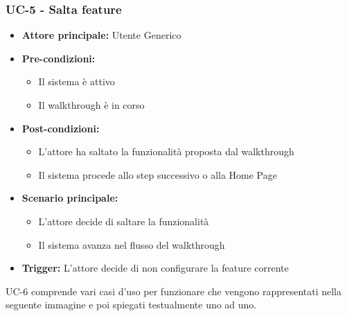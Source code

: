 \documentclass[a4paper,12pt]{article}
\begin{document}
\subsubsection{UC-5 - Salta feature} \label{subsec:UC-5}
\begin{itemize}
    \item \textbf{Attore principale:} Utente Generico
    \item \textbf{Pre-condizioni:}
    \begin{itemize}
        \item Il sistema è attivo
        \item Il walkthrough è in corso
    \end{itemize}
    \item \textbf{Post-condizioni:}
    \begin{itemize}
        \item L'attore ha saltato la funzionalità proposta dal walkthrough
        \item Il sistema procede allo step successivo o alla Home Page
    \end{itemize}
    \item \textbf{Scenario principale:}
    \begin{itemize}
        \item L'attore decide di saltare la funzionalità
        \item Il sistema avanza nel flusso del walkthrough
    \end{itemize}
    \item \textbf{Trigger:} L'attore decide di non configurare la feature corrente
\end{itemize}


UC-6 comprende vari casi d'uso per funzionare che vengono rappresentati nella seguente immagine e poi spiegati testualmente uno ad uno.
\end{document}
